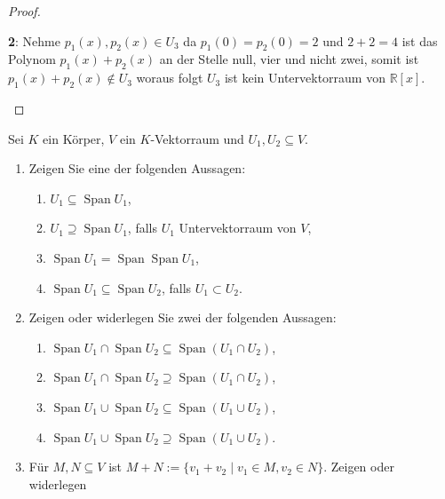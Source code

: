 \documentclass{../problemset}
\begin{document}
\begin{problem}
\begin{proof}
\begin{enumerate}
\begin{enumerate}
			            \textbf{2}: Nehme $p_1(x), p_2(x) \in U_3$ da $p_1(0) = p_2(0) = 2$ und $2 + 2 = 4$
			            ist das Polynom $p_1(x) + p_2(x)$ an der Stelle null, vier und nicht zwei, somit ist $p_1(x) + p_2(x) \not \in U_3$
			            woraus folgt $U_3$ ist kein Untervektorraum von $\mathbb{R}[x]$.
		      \end{enumerate}
	\end{enumerate}


\end{proof}
\end{problem}

\pagebreak

\begin{problem}
Sei $K$ ein Körper, $V$ ein $K$-Vektorraum und $U_1, U_2 \subseteq V$.
\begin{enumerate}
	\item Zeigen Sie eine der folgenden Aussagen:
	      \begin{enumerate}[label=\alph*)]
		      \item $U_1 \subseteq \operatorname{Span} U_1$,
		      \item $U_1 \supseteq \operatorname{Span} U_1$, falls $U_1$ Untervektorraum von $V$,
		      \item $\operatorname{Span} U_1 = \operatorname{Span} \operatorname{Span} U_1$,
		      \item $\operatorname{Span} U_1 \subseteq \operatorname{Span} U_2$, falls $U_1 \subset U_2$.
	      \end{enumerate}
	\item Zeigen oder widerlegen Sie zwei der folgenden Aussagen:
	      \begin{enumerate}[label=\alph*)]
		      \item $\operatorname{Span} U_1 \cap \operatorname{Span} U_2 \subseteq \operatorname{Span}(U_1 \cap U_2)$,
		      \item $\operatorname{Span} U_1 \cap \operatorname{Span} U_2 \supseteq \operatorname{Span}(U_1 \cap U_2)$,
		      \item $\operatorname{Span} U_1 \cup \operatorname{Span} U_2 \subseteq \operatorname{Span}(U_1 \cup U_2)$,
		      \item $\operatorname{Span} U_1 \cup \operatorname{Span} U_2 \supseteq \operatorname{Span}(U_1 \cup U_2)$.
	      \end{enumerate}
	\item Für $M, N \subseteq V$ ist $M + N := \{v_1 + v_2 \mid v_1 \in M, v_2 \in N\}$. Zeigen oder widerlegen


\end{enumerate}
\end{problem}
\end{document}
